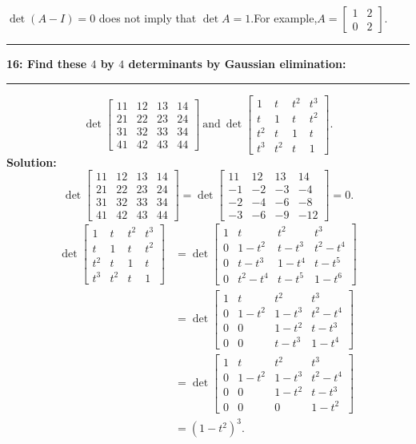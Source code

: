 \documentclass[11pt]{article}
\newcommand\question[2]{\vspace{.25in}\hrule\textbf{#1: #2}\vspace{.5em}\hrule\vspace{.10in}}
\newcommand\solution{\vspace{.10in}\textbf{Solution: }}
\begin{document}
$\det (A-I)=0$ does not imply that $\det A=1$.For example,$A=
\begin{bmatrix}
  1&2\\
  0&2
\end{bmatrix}.
$
\question{16}{Find these $4$ by $4$ determinants by Gaussian
  elimination:}
$$
\det
\begin{bmatrix}
  11&12&13&14\\
  21&22&23&24\\
  31&32&33&34\\
  41&42&43&44
\end{bmatrix}~\mbox{and}~\det
\begin{bmatrix}
  1&t&t^2&t^3\\
  t&1&t&t^2\\
  t^2&t&1&t\\
  t^3&t^2&t&1
\end{bmatrix}.
$$
\solution 
$$
  \det
  \begin{bmatrix}
    11&12&13&14\\
    21&22&23&24\\
    31&32&33&34\\
    41&42&43&44
  \end{bmatrix}=\det
                 \begin{bmatrix}
                   11&12&13&14\\
-1&-2&-3&-4\\
-2&-4&-6&-8\\
-3&-6&-9&-12
                 \end{bmatrix}=0.
$$
\begin{align*}
\det
\begin{bmatrix}
  1&t&t^2&t^3\\
  t&1&t&t^2\\
t^2&t&1&t\\
t^3&t^2&t&1
\end{bmatrix}&=\det
\begin{bmatrix}
  1&t&t^2&t^3\\
  0&1-t^2&t-t^3&t^2-t^4\\
  0&t-t^3&1-t^4&t-t^5\\
  0&t^2-t^4&t-t^5&1-t^6
\end{bmatrix}
\\&=\det
    \begin{bmatrix}
      1&t&t^2&t^3\\
      0&1-t^2&1-t^3&t^2-t^4\\
      0&0&1-t^2&t-t^{3}\\
      0&0&t-t^{3}&1-t^4
    \end{bmatrix}
\\&=\det
    \begin{bmatrix}
      1&t&t^2&t^3\\
0&1-t^2&1-t^3&t^2-t^4\\
0&0&1-t^2&t-t^3\\
0&0&0&1-t^2
    \end{bmatrix}
\\&=(1-t^2)^3.
\end{align*}
\end{document}
